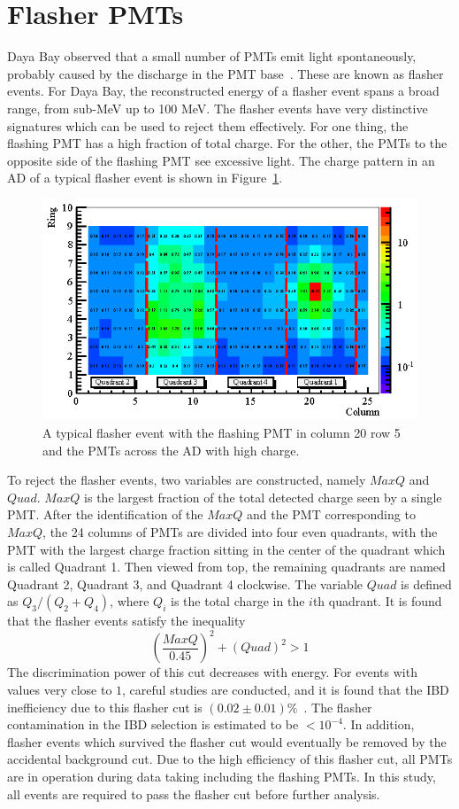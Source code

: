\section{Flasher PMTs}
Daya Bay observed that a small number of PMTs emit light spontaneously, probably caused by the discharge in the PMT base~\cite{dayabay2012_2}. These are known as flasher events. For Daya Bay, the reconstructed energy of a flasher event spans a broad range, from sub-MeV up to 100 MeV. The flasher events have very distinctive signatures which can be used to reject them effectively. For one thing, the flashing PMT has a high fraction of total charge. For the other, the PMTs to the opposite side of the flashing PMT see excessive light. The charge pattern in an AD of a typical flasher event is shown in Figure~\ref{fig:flasher_charge_pattern}.
\begin{figure}
	\centering
	\includegraphics[width=.7\textwidth]{figures/chap4/flasher_charge_patter.eps}
	\caption{A typical flasher event with the flashing PMT in column 20 row 5 and the PMTs across the AD with high charge.}
	\label{fig:flasher_charge_pattern}
\end{figure}
To reject the flasher events, two variables are constructed, namely $MaxQ$ and $Quad$. $MaxQ$ is the largest fraction of the total detected charge seen by a single PMT. After the identification of the $MaxQ$ and the PMT corresponding to $MaxQ$, the 24 columns of PMTs are divided into four even quadrants, with the PMT with the largest charge fraction sitting in the center of the quadrant which is called Quadrant 1. Then viewed from top, the remaining quadrants are named Quadrant 2, Quadrant 3, and Quadrant 4 clockwise. The variable $Quad$ is defined as $Q_3/(Q_2+Q_4)$, where $Q_i$ is the total charge in the $i$th quadrant. It is found that the flasher events satisfy the inequality
\begin{equation}
	\left(\frac{MaxQ}{0.45}\right)^2+\left(Quad\right)^2>1
\end{equation}
The discrimination power of this cut decreases with energy. For events with values very close to $1$, careful studies are conducted, and it is found that the IBD inefficiency due to this flasher cut is $(0.02\pm 0.01)\%$~\cite{dayabay2013}. The flasher contamination in the IBD selection is estimated to be $<10^{-4}$. In addition, flasher events which survived the flasher cut would eventually be removed by the accidental background cut. Due to the high efficiency of this flasher cut, all PMTs are in operation during data taking including the flashing PMTs. In this study, all events are required to pass the flasher cut before further analysis.

